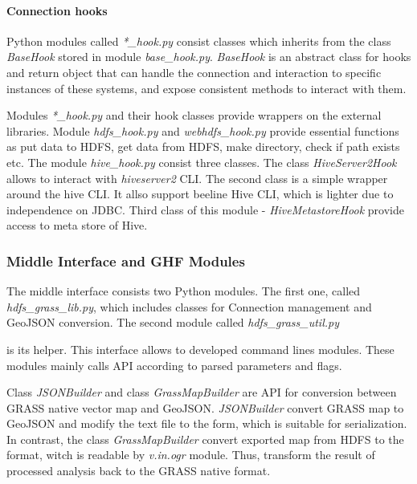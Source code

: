 \documentclass[a4paper,12pt,oneside]{report}
\begin{document}
	\paragraph{Connection hooks}
	Python modules called \textit{*\_hook.py} consist classes which inherits from
	the class \textit{BaseHook} stored in module \textit{base\_hook.py}.
	\textit{BaseHook} is an abstract class for hooks and return object that can
	handle the connection and interaction to specific instances of these systems,
	and expose consistent methods to interact with them.
	
	Modules \textit{*\_hook.py} and their hook classes provide wrappers on the
	external libraries. Module \textit{hdfs\_hook.py} and \textit{webhdfs\_hook.py}
	provide essential functions as put data to HDFS, get data from HDFS, make
	directory, check if path exists etc. 
	The module \textit{ hive\_hook.py} consist three classes. The class
	\textit{HiveServer2Hook} allows to interact with \textit{hiveserver2} CLI. The
	second class is a simple wrapper around the hive CLI. It allso support beeline
	Hive CLI, which is lighter due to independence on JDBC. Third class of this
	module -  \textit{HiveMetastoreHook} provide access to meta store of Hive. 
	
	\subsubsection{Middle Interface and GHF Modules}
	The middle interface consists two Python modules. The first one, called
	\textit{hdfs\_grass\_lib.py}, which includes classes for Connection management
	and GeoJSON conversion.  The second module called \textit{hdfs\_grass\_util.py}

	is its helper. This interface allows to developed command lines
	modules. These modules mainly calls API according to parsed parameters and flags.  
	
	Class \textit{JSONBuilder} and class \textit{GrassMapBuilder} are API for
	conversion between GRASS native vector map and GeoJSON.  \textit{JSONBuilder}
	convert GRASS map to GeoJSON and modify the text file to the form, which is
	suitable for serialization. In contrast, the class \textit{GrassMapBuilder}
	convert exported map from HDFS to the format, witch is readable by
	\textit{v.in.ogr} module. Thus, transform the result of processed analysis back
	to the GRASS native format.
	
\end{document}
